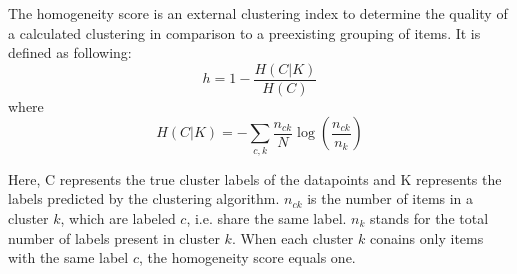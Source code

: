 The homogeneity score is an external clustering index to determine the quality of a calculated clustering in comparison to a preexisting grouping of items.
It is defined as following: \cite{rosenberg2007v}\\
$$h = 1 - \frac{H(C|K)}{H(C)}$$
where
$$H(C|K) = - \sum_{c,k} \frac{n_{ck}}{N}\log\left(\frac{n_{ck}}{n_k}\right)$$

Here, C represents the true cluster labels of the datapoints and K represents the labels predicted by the clustering algorithm. $n_{ck}$ is the number of items in a cluster $k$, which are labeled $c$, i.e. share the same label. $n_k$ stands for the total number of labels present in cluster $k$.
When each cluster $k$ conains only items with the same label $c$, the homogeneity score equals one.
